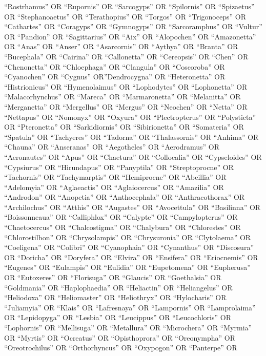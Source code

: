 \documentclass[
  number,
  review,
  onecolumn]{elsarticle}
\begin{document}
``Rostrhamus'' OR ``Rupornis'' OR ``Sarcogyps'' OR ``Spilornis'' OR
``Spizaetus'' OR ``Stephanoaetus'' OR ``Terathopius'' OR ``Torgos'' OR
``Trigonoceps'' OR ``Cathartes'' OR ``Coragyps'' OR ``Gymnogyps'' OR
``Sarcoramphus'' OR ``Vultur'' OR ``Pandion'' OR ``Sagittarius'' OR
``Aix'' OR ``Alopochen'' OR ``Amazonetta'' OR ``Anas'' OR ``Anser'' OR
``Asarcornis'' OR ``Aythya'' OR ``Branta'' OR ``Bucephala'' OR
``Cairina'' OR ``Callonetta'' OR ``Cereopsis'' OR ``Chen'' OR
``Chenonetta'' OR ``Chloephaga'' OR ``Clangula'' OR ``Coscoroba'' OR
``Cyanochen'' OR ``Cygnus'' OR''Dendrocygna'' OR ``Heteronetta'' OR
``Histrionicus'' OR ``Hymenolaimus'' OR ``Lophodytes'' OR ``Lophonetta''
OR ``Malacorhynchus'' OR ``Mareca'' OR ``Marmaronetta'' OR ``Melanitta''
OR ``Merganetta'' OR ``Mergellus'' OR ``Mergus'' OR ``Neochen'' OR
``Netta'' OR ``Nettapus'' OR ``Nomonyx'' OR ``Oxyura'' OR
``Plectropterus'' OR ``Polysticta'' OR ``Pteronetta'' OR
``Sarkidiornis'' OR ``Sibirionetta'' OR ``Somateria'' OR ``Spatula'' OR
``Tachyeres'' OR ``Tadorna'' OR ``Thalassornis'' OR ``Anhima'' OR
``Chauna'' OR ``Anseranas'' OR ``Aegotheles'' OR ``Aerodramus'' OR
``Aeronautes'' OR ``Apus'' OR ``Chaetura'' OR ``Collocalia'' OR
``Cypseloides'' OR ``Cypsiurus'' OR ``Hirundapus'' OR ``Panyptila'' OR
``Streptoprocne'' OR ``Tachornis'' OR ``Tachymarptis'' OR ``Hemiprocne''
OR ``Abeillia'' OR ``Adelomyia'' OR ``Aglaeactis'' OR ``Aglaiocercus''
OR ``Amazilia'' OR ``Androdon'' OR ``Anopetia'' OR ``Anthocephala'' OR
``Anthracothorax'' OR ``Archilochus'' OR ``Atthis'' OR ``Augastes'' OR
``Avocettula'' OR ``Basilinna'' OR ``Boissonneaua'' OR ``Calliphlox'' OR
``Calypte'' OR ``Campylopterus'' OR ``Chaetocercus'' OR ``Chalcostigma''
OR ``Chalybura'' OR ``Chlorestes'' OR ``Chlorostilbon'' OR
``Chrysolampis'' OR ``Chrysuronia'' OR ``Clytolaema'' OR ``Coeligena''
OR ``Colibri'' OR ``Cyanophaia'' OR ``Cynanthus'' OR ``Discosura'' OR
``Doricha'' OR ``Doryfera'' OR ``Elvira'' OR ``Ensifera'' OR
``Eriocnemis'' OR ``Eugenes'' OR ``Eulampis'' OR ``Eulidia'' OR
``Eupetomena'' OR ``Eupherusa'' OR ``Eutoxeres'' OR ``Florisuga'' OR
``Glaucis'' OR ``Goethalsia'' OR ``Goldmania'' OR ``Haplophaedia'' OR
``Heliactin'' OR ``Heliangelus'' OR ``Heliodoxa'' OR ``Heliomaster'' OR
``Heliothryx'' OR ``Hylocharis'' OR ``Juliamyia'' OR ``Klais'' OR
``Lafresnaya'' OR ``Lampornis'' OR ``Lamprolaima'' OR ``Lepidopyga'' OR
``Lesbia'' OR ``Leucippus'' OR ``Leucochloris'' OR ``Lophornis'' OR
``Mellisuga'' OR ``Metallura'' OR ``Microchera'' OR ``Myrmia'' OR
``Myrtis'' OR ``Ocreatus'' OR ``Opisthoprora'' OR ``Oreonympha'' OR
``Oreotrochilus'' OR ``Orthorhyncus'' OR ``Oxypogon'' OR ``Panterpe'' OR
\end{document}
